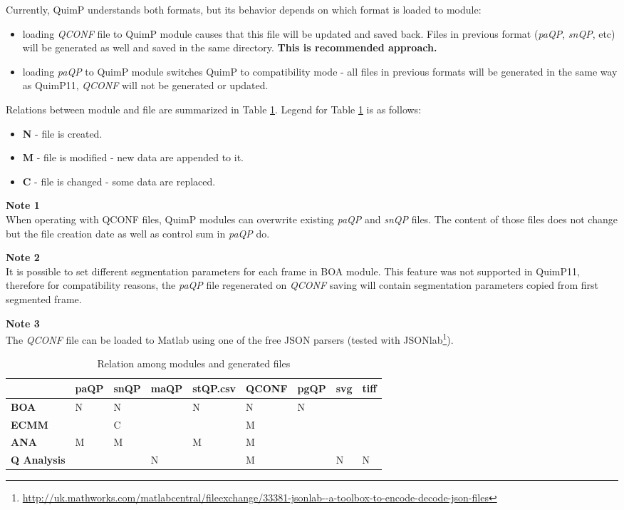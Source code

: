 \documentclass[a4paper,12pt]{article}
\begin{document}
Currently, QuimP understands both formats, but its behavior depends on which format is loaded to module:
\begin{itemize}
	\item loading \textit{QCONF} file to QuimP module causes that this file will be updated and saved back. Files in previous format (\textit{paQP}, \textit{snQP}, etc) will be generated as well and saved in the same directory. \textbf{This is recommended approach.}
	\item loading \textit{paQP} to QuimP module switches QuimP to compatibility mode - all files in previous formats will be generated in the same way as QuimP11, \textit{QCONF} will not be generated or updated. 
\end{itemize}     
Relations between module and file are summarized in Table \ref{filestable}. Legend for Table \ref{filestable} is as follows:
\begin{itemize}
	\item \textbf{N} - file is created.
	\item \textbf{M} - file is modified - new data are appended to it.
	\item \textbf{C} - file is changed - some data are replaced.
\end{itemize}
\textbf{Note 1} \\
When operating with QCONF files, QuimP modules can overwrite existing \textit{paQP} and \textit{snQP} files. The content of those files does not change but the file creation date as well as control sum in \textit{paQP} do.

\textbf{Note 2} \\
It is possible to set different segmentation parameters for each frame in BOA module. This feature was not supported in QuimP11, therefore for compatibility reasons, the \textit{paQP} file regenerated on \textit{QCONF} saving will contain segmentation parameters copied from first segmented frame.

\textbf{Note 3} \\
The \textit{QCONF} file can be loaded to Matlab using one of the free JSON parsers (tested with JSONlab\footnote{\url{http://uk.mathworks.com/matlabcentral/fileexchange/33381-jsonlab--a-toolbox-to-encode-decode-json-files}}).
\begin{table}[]
	\centering
	\caption{Relation among modules and generated files}
	\label{filestable}
	\begin{tabular}{|l|l|l|l|l|l|l|l|l|}
		&  \textbf{paQP}&  \textbf{snQP}&  \textbf{maQP}&  \textbf{stQP.csv}&  \textbf{QCONF}&  \textbf{pgQP}& \textbf{svg}&  \textbf{tiff}\\ \hline
		\textbf{BOA} &   N&  N&  &  N&  N&  N&  &  \\
		\textbf{ECMM}&    &  C&  &   &  M&   &  &  \\
		\textbf{ANA} &   M&  M&  &  M&  M&   &  &  \\
		\textbf{Q Analysis}&  &  &  N&  &  M&  &  N& N 
	\end{tabular}
\end{table}
\end{document}
